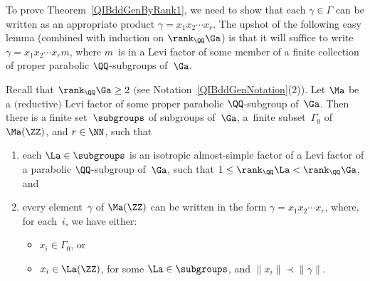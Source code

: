 To prove Theorem~\ref{QIBddGenByRank1}, we need to show that each $\gamma \in \Gamma$ can be written as an appropriate product $\gamma = x_1x_2\cdots x_r$. The upshot of the following easy lemma (combined with induction on $\rank_\QQ \Ga$) is that it will suffice to write $\gamma = x_1x_2\cdots x_r m$, where $m$~is in a Levi factor of some member of a finite collection of proper parabolic $\QQ$-subgroups of~$\Ga$.

\begin{lem} \label{LeviOK}
Recall that $\rank_\QQ \Ga \ge 2$ $($see Notation~{\rm \ref{QIBddGenNotation}(2))}.
Let $\Ma$ be a $($reductive$)$ Levi factor of some proper parabolic $\QQ$-subgroup of~$\Ga$. Then there is a finite set~$\subgroups$ of subgroups of~$\Ga$, a~finite subset~$\Gamma_0$ of~$\Ma(\ZZ)$, and $r \in \NN$, such that
\begin{enumerate}\itemsep=0pt
\item[$1)$] each $\La \in \subgroups$ is an isotropic almost-simple factor of a Levi factor of a parabolic $\QQ$-subgroup of~$\Ga$, such that $1 \le \rank_\QQ \La < \rank_\QQ \Ga$, and
\item[$2)$] every element~$\gamma$ of $\Ma(\ZZ)$ can be written in the form $\gamma = x_1 x_2 \cdots x_r$, where, for each~$i$, we have either:
\begin{itemize}\itemsep=0pt
\item $x_i \in \Gamma_0$, or
\item $x_i \in \La(\ZZ)$, for some $\La \in \subgroups$, and $\|x_i\| \prec \|\gamma\|$.
\end{itemize}
\end{enumerate}
\end{lem}

